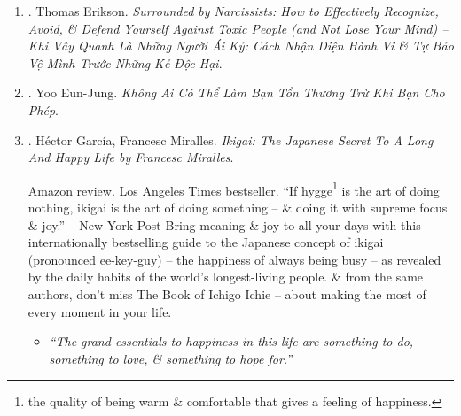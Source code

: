 \documentclass{article}
\begin{document}
\begin{enumerate}
	{\sf Amazon review.} From the Sunday Times bestselling author of {\it Surrounded by Idiots}
	
	Are you overshadowed by narcissists in your life? Are you worn out by their constant demands for attention, their absolute belief they are right (even when clearly they are not), their determination to do what they want (regardless of impact), \& their baffling need to control everyone \& everything around them?
	
	In this thought-provoking, sanity-saving book, {\sc Thomas Erikson} helps you understand what makes narcissists tick, \& crucially, how to handle them without wearing yourself out in process. With help of behavioral model made famous in {\it Surrounded by Idiots}, {\sc Erikson} provides all tools you need to manage not just narcissists around you but everyday narcissism as well -- itself becoming more widespread in this age of social media. Engaging \& practical, {\it Surrounded by Narcissists} will help you free yourself from narcissistic agendas so you can pursue a happier, more fulfilling \& successful life.	
	
	\item \cite{Erikson_narcisisst_VN}. {\sc Thomas Erikson}. {\it Surrounded by Narcissists: How to Effectively Recognize, Avoid, \& Defend Yourself Against Toxic People (and Not Lose Your Mind) -- Khi Vây Quanh Là Những Người Ái Kỷ: Cách Nhận Diện Hành Vi \& Tự Bảo Vệ Mình Trước Những Kẻ Độc Hại}.\hfill{\sf[reading]}
	
	\item \cite{Eun-Jung_hurt_VN}. Yoo Eun-Jung. {\it Không Ai Có Thể Làm Bạn Tổn Thương Trừ Khi Bạn Cho Phép}.\hfill{\sf[done]}
		
	\item \cite{Garcia_Miralles_ikigai}. {\sc H\'ector Garc\'ia, Francesc Miralles}. {\it Ikigai: The Japanese Secret To A Long And Happy Life by Francesc Miralles}. {}
	
	{\sf Amazon review.} Los Angeles Times bestseller. ``If hygge\footnote{the quality of being warm \& comfortable that gives a feeling of happiness.} is the art of doing nothing, ikigai is the art of doing something -- \& doing it with supreme focus \& joy.'' -- New York Post Bring meaning \& joy to all your days with this internationally bestselling guide to the Japanese concept of ikigai (pronounced ee-key-guy) -- the happiness of always being busy -- as revealed by the daily habits of the world's longest-living people. \& from the same authors, don't miss The Book of Ichigo Ichie -- about making the most of every moment in your life.
	\begin{itemize}
		\item {\it``The grand essentials to happiness in this life are something to do, something to love, \& something to hope for.''}
		

\end{itemize}
\end{enumerate}
\end{document}

